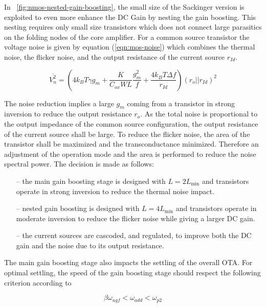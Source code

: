 In \figurename~\ref{fig:nmos-nested-gain-boosting}, the small size of the Sackinger version is exploited to even more enhance the DC Gain by nesting the gain boosting. This nesting requires only small size transistors which does not connect large parasitics on the folding nodes of the core amplifier. For a common source transistor the voltage noise is given by equation (\ref{eqn:mos-noise}) which combines the thermal noise, the flicker noise, and the output resistance of the current source \(r_{Id} \).

\begin{equation}
    \label{eqn:mos-noise}
\overline{V_n^2} = \left(4k_BT\gamma g_m + \frac{K}{C_{ox}WL} \frac{g_m^2}{f} + \frac{4k_BT\Delta f}{r_{Id}}\right) {(r_o || r_{Id})}^2
\end{equation}

The noise reduction implies a large \(g_m \) coming from a transistor in strong inversion to reduce the output resistance \(r_o\). As the total noise is proportional to the output impedance of the common source configuration, the output resistance of the current source shall be large. To reduce the flicker noise, the area of the transistor shall be maximized and the transconductance minimized. Therefore an adjustment of the operation mode and the area is performed to reduce the noise spectral power. The decision is made as follows:

\begin{itemize}
    \itemsep-0.5em
    \item[--] the main gain boosting stage is designed with \(L=2L_{\min}\) and transistors operate in strong inversion to reduce the thermal noise impact.
    \item[--] nested gain boosting is designed with \(L=4L_{\min}\) and transistors operate in moderate inversion to reduce the flicker noise while giving a larger DC gain.
    \item[--] the current sources are cascoded, and regulated, to improve both the DC gain and the noise due to its output resistance.
\end{itemize}

The main gain boosting stage also impacts the settling of the overall OTA\@. For optimal settling, the speed of the gain boosting stage should respect the following criterion according to~\cite{Bult1991}

\begin{equation}
\beta \omega_{ugf} < \omega_{add} < \omega_{p2}
\end{equation}

